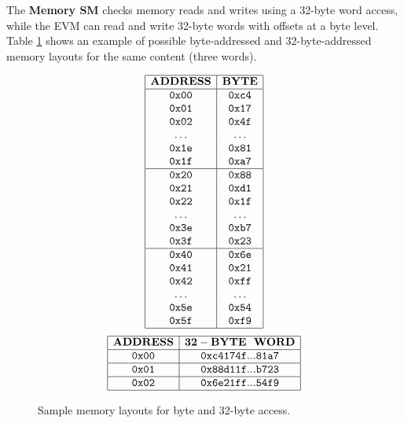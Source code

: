 The \textbf{Memory SM} checks memory reads and writes using a 32-byte word access, while
the EVM can read and write 32-byte words with offsets at a byte level.
Table \ref{tab:byte:32byte:example} shows an example of possible byte-addressed and 32-byte-addressed memory layouts for the same content (three words).

\begin{figure}[h!]
    \renewcommand{\figurename}{Table}
    \[
    \begin{array}{|c|c|}
        \hline
        \mathbf{ADDRESS} &\mathbf{BYTE} \\ \hline
        \mathtt{0x00} &\mathtt{0xc4} \\
        \mathtt{0x01} &\mathtt{0x17} \\
        \mathtt{0x02} &\mathtt{0x4f} \\
        \mathtt{\ldots} &\mathtt{\ldots} \\
        \mathtt{0x1e} &\mathtt{0x81} \\
        \mathtt{0x1f} &\mathtt{0xa7} \\
        \hline
        \mathtt{0x20} &\mathtt{0x88} \\
        \mathtt{0x21} &\mathtt{0xd1} \\
        \mathtt{0x22} &\mathtt{0x1f} \\
        \mathtt{\ldots} &\mathtt{\ldots} \\
        \mathtt{0x3e} &\mathtt{0xb7} \\
        \mathtt{0x3f} &\mathtt{0x23} \\
        \hline
        \mathtt{0x40} &\mathtt{0x6e} \\
        \mathtt{0x41} &\mathtt{0x21} \\
        \mathtt{0x42} &\mathtt{0xff} \\
        \mathtt{\ldots} &\mathtt{\ldots} \\
        \mathtt{0x5e} &\mathtt{0x54} \\
        \mathtt{0x5f} &\mathtt{0xf9} \\
        \hline
    \end{array}
    \]
    \[
    \begin{array}{|c|c|}
        \hline
        \mathbf{ADDRESS} &\mathbf{32-BYTE~~WORD} \\ \hline
        \mathtt{0x00} &\mathtt{0xc4174f...81a7} \\
        \hline
        \mathtt{0x01} &\mathtt{0x88d11f...b723} \\
        \hline
        \mathtt{0x02} &\mathtt{0x6e21ff...54f9} \\
        \hline
    \end{array}
    \]
    \caption{Sample memory layouts for byte and 32-byte access.}
    \label{tab:byte:32byte:example}
\end{figure}

